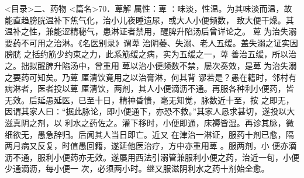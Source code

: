\documentclass[a4paper,12pt,UTF8,twoside]{ctexbook}
\begin{document}
<目录>二、药物
<篇名>70．萆解
属性：萆 ∶味淡，性温。为其味淡而温，故能直趋膀胱温补下焦气化，治小儿夜睡遗尿，或大人小便频数， 
致大便干燥。其温补之性，兼能涩精秘气，患淋证者禁用，醒脾升陷汤后曾详论之。 
萆 为治失溺要药不可用之治淋。《名医别录》谓萆 治阴萎、失溺、老人五缓。盖失溺之证实因膀胱 
之括约筋少约束之力，此系筋缓之病，实为五缓之一，萆 善治五缓，所以治之。拙拟醒脾升陷汤中，曾重用 
萆以治小便频数不禁，屡次奏效，是萆 为治失溺之要药可知矣。乃萆 厘清饮竟用之以治膏淋，何其背 
谬若是？愚在籍时，邻村有病淋者，医者投以萆 厘清饮，两剂，其人小便滴沥不通。再服各种利小便药，皆 
无效。后延愚延医，已至十日，精神昏愦，毫无知觉，脉数近十至，按 
之即无，因谓其家人曰∶“据此脉论，即小便通下，亦恐不救。”其家人恳求甚切，遂投以大滋真阴之剂，以 
利水之药佐之。灌下移时，小便即通，床褥皆湿。再诊其脉，微细欲无，愚急辞归。后闻其人当日即亡。近又 
在津治一淋证，服药十剂已愈，隔两月病又反复，时值愚回籍，遂延他医治疗，方中亦重用萆 。服两剂，小 
便亦滴沥不通，服利小便药亦无效。遂屡用西法引溺管兼服利小便之药，治近一旬，小便少通滴沥，每小便一 
次，必须两小时。继又服滋阴利水之药十剂始全愈。 
\end{document}
